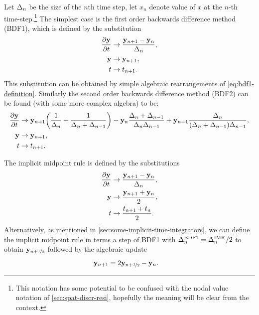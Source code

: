 Let $\Delta_{n}$ be the size of the $n$th time step, let $x_n$ denote value of $x$ at the $n$-th time-step.\footnote{This notation has some potential to be confused with the nodal value notation of \cref{sec:spat-discr-resi}, hopefully the meaning will be clear from the context.}
The simplest case is the first order backwards difference method (BDF1), which is defined by the substitution
\begin{equation}
  \begin{aligned}
    \frac{\partial \mathbf{y}}{\partial t} &\rightarrow \frac{\mathbf{y}_{n+1} - \mathbf{y}_n}{\Delta_{n}}, \\
    \mathbf{y} &\rightarrow \mathbf{y}_{n+1}, \\
    t &\rightarrow t_{n+1}.
    \label{eq:impl-bdf1}
  \end{aligned}
\end{equation}
This substitution can be obtained by simple algebraic rearrangements of \cref{eq:bdf1-definition}.
Similarly the second order backwards difference method (BDF2) can be found (with some more complex algebra) to be:
\begin{equation}
  \begin{aligned}
    \frac{\partial \mathbf{y}}{\partial t} &\rightarrow \mathbf{y}_{n+1}{\left( \frac{1}{\Delta_{n}} + \frac{1}{\Delta_{n} + \Delta_{n-1}} \right)}
    - \mathbf{y}_n \frac{\Delta_{n} + \Delta_{n-1}}{\Delta_{n}\Delta_{n-1}}
    + \mathbf{y}_{n-1} \frac{\Delta_{n}}{(\Delta_{n} + \Delta_{n-1})\Delta_{n-1}}, \\
    \mathbf{y} &\rightarrow \mathbf{y}_{n+1}, \\
    t &\rightarrow t_{n+1}.
    \label{eq:impl-bdf2}
  \end{aligned}
\end{equation}

The implicit midpoint rule is defined by the substitutions
\begin{equation}
  \begin{aligned}
    \frac{\partial \mathbf{y}}{\partial t} &\rightarrow \frac{\mathbf{y}_{n+1} - \mathbf{y}_n}{\Delta_{n}}, \\
    \mathbf{y} &\rightarrow \frac{\mathbf{y}_{n+1} + \mathbf{y}_n}{2}, \\
    t &\rightarrow \frac{t_{n+1} + t_n}{2}.
    \label{eq:impl-imr}
  \end{aligned}
\end{equation}
Alternatively, as mentioned in \cref{sec:some-implicit-time-integrators}, we can define the implicit midpoint rule in terms a step of BDF1 with $\Delta_{n}^{\mathrm{BDF1}} = \Delta_{n}^{\mathrm{IMR}}/2$ to obtain $\mathbf{y}_{n+\nicefrac{1}{2}}$ followed by the algebraic update
\begin{equation}
  \begin{aligned}
    \label{eq:imr-bdf1}
    \mathbf{y}_{n+1} &= 2\mathbf{y}_{n+\nicefrac{1}{2}} - \mathbf{y}_n.
  \end{aligned}
\end{equation}

